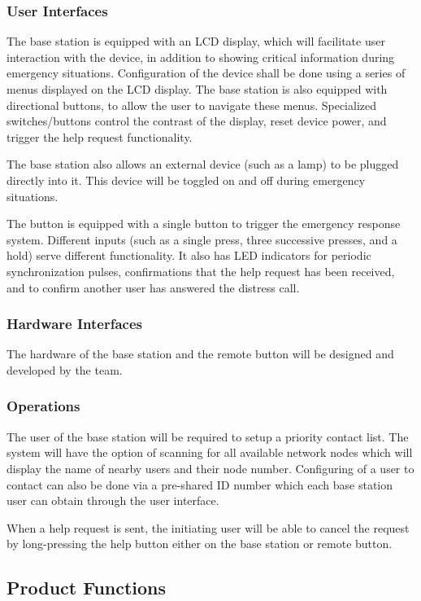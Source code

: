 \documentclass[journal,compsoc]{IEEEtran}
\begin{document}
\subsubsection{User Interfaces}
The base station is equipped with an LCD display, which will facilitate user interaction with the device, in addition to showing critical information during emergency situations. Configuration of the device shall be done using a series of menus displayed on the LCD display. The base station is also equipped with directional buttons, to allow the user to navigate these menus. Specialized switches/buttons control the contrast of the display, reset device power, and trigger the help request functionality.

The base station also allows an external device (such as a lamp) to be plugged directly into it. This device will be toggled on and off during emergency situations.

The button is equipped with a single button to trigger the emergency response system. Different inputs (such as a single press, three successive presses, and a hold) serve different functionality. It also has LED indicators for periodic synchronization pulses, confirmations that the help request has been received, and to confirm another user has answered the distress call.

\subsubsection{Hardware Interfaces}
The hardware of the base station and the remote button will be designed and developed by the team.

\subsubsection{Operations}
The user of the base station will be required to setup a priority contact list.  The system will have the option of scanning for all available network nodes which will display the name of nearby users and their node number.  Configuring of a user to contact can also be done via a pre-shared ID number which each base station user can obtain through the user interface.

When a help request is sent, the initiating user will be able to cancel the request by long-pressing the help button either on the base station or remote button.

\subsection{Product Functions}
\end{document}
